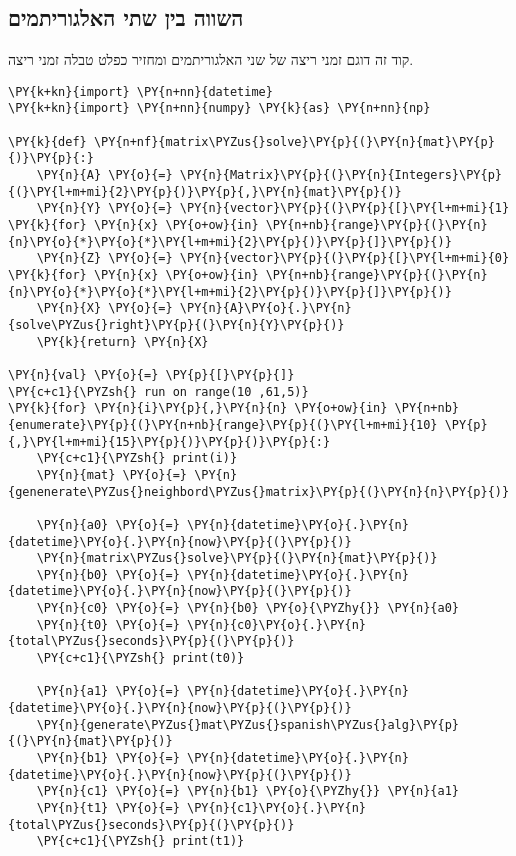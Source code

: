     \hypertarget{benchmark}{%
\subsection{השווה בין שתי האלגוריתמים}\label{benchmark}}
קוד זה דוגם זמני ריצה של שני האלגוריתמים ומחזיר כפלט טבלה זמני ריצה.
\begin{english}
    \begin{tcolorbox}[breakable, size=fbox, boxrule=1pt, pad at break*=1mm,colback=cellbackground, colframe=cellborder]
\begin{Verbatim}[commandchars=\\\{\}]
\PY{k+kn}{import} \PY{n+nn}{datetime}
\PY{k+kn}{import} \PY{n+nn}{numpy} \PY{k}{as} \PY{n+nn}{np}

\PY{k}{def} \PY{n+nf}{matrix\PYZus{}solve}\PY{p}{(}\PY{n}{mat}\PY{p}{)}\PY{p}{:}
    \PY{n}{A} \PY{o}{=} \PY{n}{Matrix}\PY{p}{(}\PY{n}{Integers}\PY{p}{(}\PY{l+m+mi}{2}\PY{p}{)}\PY{p}{,}\PY{n}{mat}\PY{p}{)}
    \PY{n}{Y} \PY{o}{=} \PY{n}{vector}\PY{p}{(}\PY{p}{[}\PY{l+m+mi}{1} \PY{k}{for} \PY{n}{x} \PY{o+ow}{in} \PY{n+nb}{range}\PY{p}{(}\PY{n}{n}\PY{o}{*}\PY{o}{*}\PY{l+m+mi}{2}\PY{p}{)}\PY{p}{]}\PY{p}{)}
    \PY{n}{Z} \PY{o}{=} \PY{n}{vector}\PY{p}{(}\PY{p}{[}\PY{l+m+mi}{0} \PY{k}{for} \PY{n}{x} \PY{o+ow}{in} \PY{n+nb}{range}\PY{p}{(}\PY{n}{n}\PY{o}{*}\PY{o}{*}\PY{l+m+mi}{2}\PY{p}{)}\PY{p}{]}\PY{p}{)}
    \PY{n}{X} \PY{o}{=} \PY{n}{A}\PY{o}{.}\PY{n}{solve\PYZus{}right}\PY{p}{(}\PY{n}{Y}\PY{p}{)}
    \PY{k}{return} \PY{n}{X}

\PY{n}{val} \PY{o}{=} \PY{p}{[}\PY{p}{]}
\PY{c+c1}{\PYZsh{} run on range(10 ,61,5)}
\PY{k}{for} \PY{n}{i}\PY{p}{,}\PY{n}{n} \PY{o+ow}{in} \PY{n+nb}{enumerate}\PY{p}{(}\PY{n+nb}{range}\PY{p}{(}\PY{l+m+mi}{10} \PY{p}{,}\PY{l+m+mi}{15}\PY{p}{)}\PY{p}{)}\PY{p}{:}
    \PY{c+c1}{\PYZsh{} print(i)}
    \PY{n}{mat} \PY{o}{=} \PY{n}{genenerate\PYZus{}neighbord\PYZus{}matrix}\PY{p}{(}\PY{n}{n}\PY{p}{)}

    \PY{n}{a0} \PY{o}{=} \PY{n}{datetime}\PY{o}{.}\PY{n}{datetime}\PY{o}{.}\PY{n}{now}\PY{p}{(}\PY{p}{)}
    \PY{n}{matrix\PYZus{}solve}\PY{p}{(}\PY{n}{mat}\PY{p}{)}
    \PY{n}{b0} \PY{o}{=} \PY{n}{datetime}\PY{o}{.}\PY{n}{datetime}\PY{o}{.}\PY{n}{now}\PY{p}{(}\PY{p}{)}
    \PY{n}{c0} \PY{o}{=} \PY{n}{b0} \PY{o}{\PYZhy{}} \PY{n}{a0}
    \PY{n}{t0} \PY{o}{=} \PY{n}{c0}\PY{o}{.}\PY{n}{total\PYZus{}seconds}\PY{p}{(}\PY{p}{)}
    \PY{c+c1}{\PYZsh{} print(t0)}
    
    \PY{n}{a1} \PY{o}{=} \PY{n}{datetime}\PY{o}{.}\PY{n}{datetime}\PY{o}{.}\PY{n}{now}\PY{p}{(}\PY{p}{)}
    \PY{n}{generate\PYZus{}mat\PYZus{}spanish\PYZus{}alg}\PY{p}{(}\PY{n}{mat}\PY{p}{)}
    \PY{n}{b1} \PY{o}{=} \PY{n}{datetime}\PY{o}{.}\PY{n}{datetime}\PY{o}{.}\PY{n}{now}\PY{p}{(}\PY{p}{)}
    \PY{n}{c1} \PY{o}{=} \PY{n}{b1} \PY{o}{\PYZhy{}} \PY{n}{a1}
    \PY{n}{t1} \PY{o}{=} \PY{n}{c1}\PY{o}{.}\PY{n}{total\PYZus{}seconds}\PY{p}{(}\PY{p}{)}
    \PY{c+c1}{\PYZsh{} print(t1)}
    

\end{Verbatim}
\end{tcolorbox}
\end{english}
